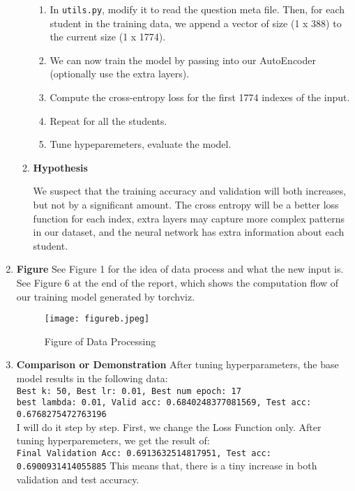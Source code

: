 \documentclass{article}
\begin{document}
\begin{enumerate}
\begin{enumerate}
    \begin{tcolorbox}[colback=gray!5!white,colframe=gray!75!black,title=Algorithm Box]
    \begin{enumerate}
        \item In \texttt{utils.py}, modify it to read the question meta file. Then, for each student in the training data, we append a vector of size (1 x 388) to the current size (1 x 1774). 
        \item We can now train the model by passing into our AutoEncoder (optionally use the extra layers).
        \item Compute the cross-entropy loss for the first 1774 indexes of the input. 
        \item Repeat for all the students. 
        \item Tune hypeparemeters, evaluate the model.
    \end{enumerate}
    \end{tcolorbox}
    \item \textbf{Hypothesis}
    \begin{tcolorbox}[colback=gray!5!white,colframe=gray!75!black,title=Hypothesis]
    We suspect that the training accuracy and validation will both increases, but not by a significant amount. The cross entropy will be a better loss function for each index, extra layers may capture more complex patterns in our dataset, and the neural network has extra information about each student.
    \end{tcolorbox}
\end{enumerate}
\item \textbf{Figure} See Figure 1 for the idea of data process and what the new input is. See Figure 6 at the end of the report, which shows the computation flow of our training model generated by torchviz. 
                \begin{figure}[ht!]
                \centering
                \texttt{[image: figureb.jpeg]}
                \caption{Figure of Data Processing}
                \label{f:figure 1}
            \end{figure}
             

            
\item \textbf{Comparison or Demonstration}
After tuning hyperparameters, the base model results in the following data: \\
\texttt{Best k: 50, Best lr: 0.01, Best num epoch: 17} \\
\texttt{best lambda: 0.01, Valid acc: 0.6840248377081569, Test acc: 0.6768275472763196} \\
I will do it step by step. First, we change the Loss Function only. After tuning hyperparemeters, we get the result of: \\
\texttt{Final Validation Acc: 0.6913632514817951, Test acc: 0.6900931414055885}
This means that, there is a tiny increase in both validation and test accuracy.


\end{enumerate}
\end{document}
